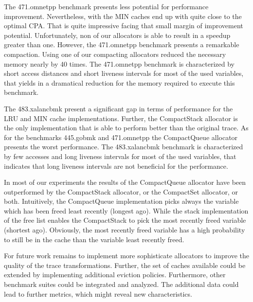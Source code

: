 \documentclass[onecolumn, openright, master, english, signatures]{dbrgrptt}
\begin{document}
The 471.omnetpp benchmark presents less potential for performance improvement. Nevertheless, with the \ac{MIN} caches end up with quite close to the optimal \ac{CPA}. That is quite impressive facing that small margin of improvement potential. Unfortunately, non of our allocators is able to result in a speedup greater than one. However, the 471.omnetpp benchmark presents a remarkable compaction. Using one of our compacting allocators reduced the necessary memory nearly by 40 times. The 471.omnetpp benchmark is characterized by short access distances and short liveness intervals for most of the used variables, that yields in a dramatical reduction for the memory required to execute this benchmark.

The 483.xalancbmk present a significant gap in terms of performance for the \ac{LRU} and \ac{MIN} cache implementations. Further, the CompactStack allocator is the only implementation that is able to perform better than the original \ac{trace}. As for the benchmarks 445.gobmk and 471.omnetpp the CompactQueue allocator presents the worst performance. The 483.xalancbmk benchmark is characterized by few accesses and long liveness intervals for most of the used variables, that indicates that long liveness intervals are not beneficial for the performance.

In most of our experiments the results of the CompactQueue allocator have been outperformed by the CompactStack allocator, or the CompactSet allocator, or both. Intuitively, the CompactQueue implementation picks always the variable which has been freed least recently (longest ago). While the stack implementation of the free list enables the CompactStack to pick the most recently freed variable (shortest ago). Obviously, the most recently freed variable has a high probability to still be in the cache than the variable least recently freed.

For future work remains to implement more sophisticate allocators to improve the quality of the trace transformations. Further, the set of caches available could be extended by implementing additional eviction policies. Furthermore, other benchmark suites could be integrated and analyzed. The additional data could lead to further metrics, which might reveal new characteristics.


\backmatter%

%
\end{document}
